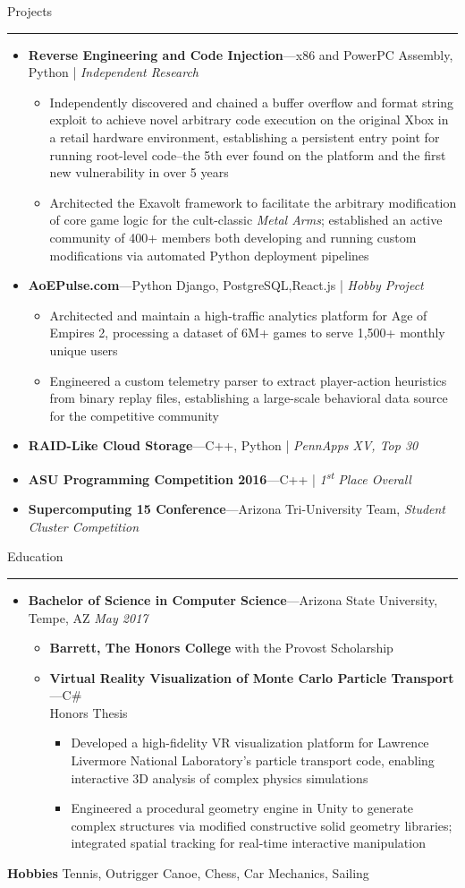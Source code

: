 \documentclass[10pt,oneside]{article}
\newcommand{\hobbies}{Tennis, Outrigger Canoe, Chess, Car Mechanics, Sailing}
\newcommand{\sectitle}[1]{
  \begin{flushleft}{\selectfont\Large#1}\end{flushleft}
}
\newenvironment{ressection}[1]{
  \vspace{0pt}
  \sectitle{#1}
  \vspace{-10pt}\rule{\textwidth}{0.5pt}
  \vspace{-10pt}
  \begin{itemize}[leftmargin=0pt, rightmargin=-5pt, label={}]
  \vspace{-2pt}
  }{
  \end{itemize}
}
\newcommand{\ressubitem}[1]{
  \vspace{-1pt}
  \item[$\bullet$] \begin{flushleft} #1 \end{flushleft}
}
\newcommand{\resbigitemlinenotools}[3]{
  \vspace{-1pt}
  \item[]
  \textbf{#1}---#2
  \hfill
  \textit{#3}
}
\newcommand{\resbigitemlinenotoolsnodate}[3]{
  \vspace{-1pt}
  \item[]
  \textbf{#1}---#3 | \textit{#2}
}
\newcommand{\resbigitemlinenotoolsnodatenopipe}[3]{
  \vspace{-1pt}
  \item[]
  \textbf{#1}---#3, \textit{#2}
}
\newcommand{\resbigsubitemlinenodate}[3]{
  \vspace{-1pt}
  \item[$\bullet$]
  \textbf{#1}---#3 \\
  #2
}
\newenvironment{ressubseclinenodate}[3]{
  \resbigitemlinenotoolsnodate{#1}{#2}{#3}
  \vspace{-2pt}
  \begin{itemize}[rightmargin=5pt]
}{
  \end{itemize}
}
\newenvironment{ressubseclinenotools}[3]{
  \resbigitemlinenotools{#1}{#2}{#3}
  \vspace{-2pt}
  \begin{itemize}[rightmargin=5pt]
}{
  \end{itemize}
}
\newenvironment{ressubitemlinenodate}[3]{
  \resbigsubitemlinenodate{#1}{#2}{#3}
  \vspace{-2pt}
  \begin{itemize}[rightmargin=5pt]
}{
  \end{itemize}
}
\begin{document}
\begin{ressection}{Projects}
  \begin{ressubseclinenodate}{Reverse Engineering and Code Injection}{Independent Research}{x86 and PowerPC Assembly, Python}
    \ressubitem{Independently discovered and chained a buffer overflow and format string exploit to achieve novel arbitrary code execution on the original Xbox in a retail hardware environment, establishing a persistent entry point for running root-level code--the 5th ever found on the platform and the first new vulnerability in over 5 years}
    \ressubitem{Architected the Exavolt framework to facilitate the arbitrary modification of core game logic for the cult-classic \textit{Metal Arms}; established an active community of 400+ members both developing and running custom modifications via automated Python deployment pipelines}
  \end{ressubseclinenodate}
  \begin{ressubseclinenodate}{AoEPulse.com}{Hobby Project}{Python Django, PostgreSQL,React.js}
    \ressubitem{Architected and maintain a high-traffic analytics platform for Age of Empires 2, processing a dataset of 6M+ games to serve 1,500+ monthly unique users}
    \ressubitem{Engineered a custom telemetry parser to extract player-action heuristics from binary replay files, establishing a large-scale behavioral data source for the competitive community}
  \end{ressubseclinenodate}
  \resbigitemlinenotoolsnodate{RAID-Like Cloud Storage}{PennApps XV, Top 30}{C++, Python}
  \resbigitemlinenotoolsnodate{ASU Programming Competition 2016}{1\textsuperscript{st} Place Overall}{C++}
  \resbigitemlinenotoolsnodatenopipe{Supercomputing 15 Conference}{Student Cluster Competition}{Arizona Tri-University Team}
\end{ressection}

\begin{ressection}{Education}
  \begin{ressubseclinenotools}{Bachelor of Science in Computer Science}{Arizona State University, Tempe, AZ}{May 2017}
    \ressubitem{\textbf{Barrett, The Honors College} with the Provost Scholarship}
    \begin{ressubitemlinenodate}{Virtual Reality Visualization of Monte Carlo Particle Transport}{Honors Thesis}{C\#}
      \ressubitem{Developed a high-fidelity VR visualization platform for Lawrence Livermore National Laboratory's particle transport code, enabling interactive 3D analysis of complex physics simulations}
      \ressubitem{Engineered a procedural geometry engine in Unity to generate complex structures via modified constructive solid geometry libraries; integrated spatial tracking for real-time interactive manipulation}
    \end{ressubitemlinenodate}
  \end{ressubseclinenotools}
\end{ressection}

\textbf{Hobbies} \hobbies \\
\end{document}

